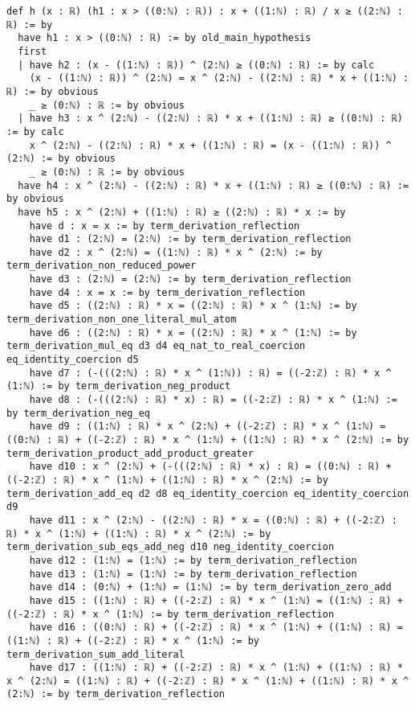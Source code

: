 \documentclass{article}
\begin{document}
\begin{tcolorbox}[colback=white!10, width=\linewidth]
\begin{lstlisting}[language=Lean4]
def h (x : ℝ) (h1 : x > ((0:ℕ) : ℝ)) : x + ((1:ℕ) : ℝ) / x ≥ ((2:ℕ) : ℝ) := by
  have h1 : x > ((0:ℕ) : ℝ) := by old_main_hypothesis
  first
  | have h2 : (x - ((1:ℕ) : ℝ)) ^ (2:ℕ) ≥ ((0:ℕ) : ℝ) := by calc
    (x - ((1:ℕ) : ℝ)) ^ (2:ℕ) = x ^ (2:ℕ) - ((2:ℕ) : ℝ) * x + ((1:ℕ) : ℝ) := by obvious
    _ ≥ (0:ℕ) : ℝ := by obvious
  | have h3 : x ^ (2:ℕ) - ((2:ℕ) : ℝ) * x + ((1:ℕ) : ℝ) ≥ ((0:ℕ) : ℝ) := by calc
    x ^ (2:ℕ) - ((2:ℕ) : ℝ) * x + ((1:ℕ) : ℝ) = (x - ((1:ℕ) : ℝ)) ^ (2:ℕ) := by obvious
    _ ≥ (0:ℕ) : ℝ := by obvious
  have h4 : x ^ (2:ℕ) - ((2:ℕ) : ℝ) * x + ((1:ℕ) : ℝ) ≥ ((0:ℕ) : ℝ) := by obvious
  have h5 : x ^ (2:ℕ) + ((1:ℕ) : ℝ) ≥ ((2:ℕ) : ℝ) * x := by
    have d : x = x := by term_derivation_reflection
    have d1 : (2:ℕ) = (2:ℕ) := by term_derivation_reflection
    have d2 : x ^ (2:ℕ) = ((1:ℕ) : ℝ) * x ^ (2:ℕ) := by term_derivation_non_reduced_power
    have d3 : (2:ℕ) = (2:ℕ) := by term_derivation_reflection
    have d4 : x = x := by term_derivation_reflection
    have d5 : ((2:ℕ) : ℝ) * x = ((2:ℕ) : ℝ) * x ^ (1:ℕ) := by term_derivation_non_one_literal_mul_atom
    have d6 : ((2:ℕ) : ℝ) * x = ((2:ℕ) : ℝ) * x ^ (1:ℕ) := by term_derivation_mul_eq d3 d4 eq_nat_to_real_coercion eq_identity_coercion d5
    have d7 : (-(((2:ℕ) : ℝ) * x ^ (1:ℕ)) : ℝ) = ((-2:ℤ) : ℝ) * x ^ (1:ℕ) := by term_derivation_neg_product
    have d8 : (-(((2:ℕ) : ℝ) * x) : ℝ) = ((-2:ℤ) : ℝ) * x ^ (1:ℕ) := by term_derivation_neg_eq
    have d9 : ((1:ℕ) : ℝ) * x ^ (2:ℕ) + ((-2:ℤ) : ℝ) * x ^ (1:ℕ) = ((0:ℕ) : ℝ) + ((-2:ℤ) : ℝ) * x ^ (1:ℕ) + ((1:ℕ) : ℝ) * x ^ (2:ℕ) := by term_derivation_product_add_product_greater
    have d10 : x ^ (2:ℕ) + (-(((2:ℕ) : ℝ) * x) : ℝ) = ((0:ℕ) : ℝ) + ((-2:ℤ) : ℝ) * x ^ (1:ℕ) + ((1:ℕ) : ℝ) * x ^ (2:ℕ) := by term_derivation_add_eq d2 d8 eq_identity_coercion eq_identity_coercion d9
    have d11 : x ^ (2:ℕ) - ((2:ℕ) : ℝ) * x = ((0:ℕ) : ℝ) + ((-2:ℤ) : ℝ) * x ^ (1:ℕ) + ((1:ℕ) : ℝ) * x ^ (2:ℕ) := by term_derivation_sub_eqs_add_neg d10 neg_identity_coercion
    have d12 : (1:ℕ) = (1:ℕ) := by term_derivation_reflection
    have d13 : (1:ℕ) = (1:ℕ) := by term_derivation_reflection
    have d14 : (0:ℕ) + (1:ℕ) = (1:ℕ) := by term_derivation_zero_add
    have d15 : ((1:ℕ) : ℝ) + ((-2:ℤ) : ℝ) * x ^ (1:ℕ) = ((1:ℕ) : ℝ) + ((-2:ℤ) : ℝ) * x ^ (1:ℕ) := by term_derivation_reflection
    have d16 : ((0:ℕ) : ℝ) + ((-2:ℤ) : ℝ) * x ^ (1:ℕ) + ((1:ℕ) : ℝ) = ((1:ℕ) : ℝ) + ((-2:ℤ) : ℝ) * x ^ (1:ℕ) := by term_derivation_sum_add_literal
    have d17 : ((1:ℕ) : ℝ) + ((-2:ℤ) : ℝ) * x ^ (1:ℕ) + ((1:ℕ) : ℝ) * x ^ (2:ℕ) = ((1:ℕ) : ℝ) + ((-2:ℤ) : ℝ) * x ^ (1:ℕ) + ((1:ℕ) : ℝ) * x ^ (2:ℕ) := by term_derivation_reflection

\end{lstlisting}
\end{tcolorbox}
\end{document}
